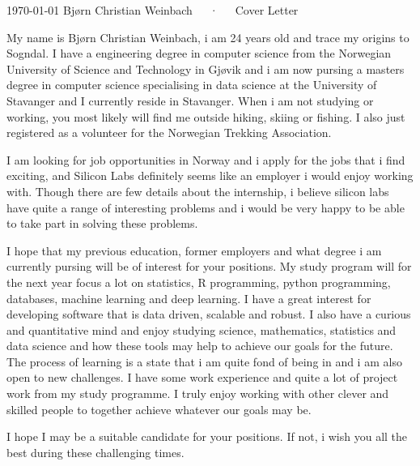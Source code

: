 \documentclass[11pt, a4paper]{awesome-cv}
\begin{document}
\makecvheader[R]

\makecvfooter
  {\today}
  {Bjørn Christian Weinbach~~~·~~~Cover Letter}
  {}

\makelettertitle

\begin{cvletter}

My name is Bjørn Christian Weinbach, i am 24 years old and trace my origins to Sogndal. I have a engineering degree in computer science from the Norwegian University of Science and Technology in Gjøvik and i am now pursing a masters degree in computer science specialising in data science at the University of Stavanger and I currently reside in Stavanger. When i am not studying or working, you most likely will find me outside hiking, skiing or fishing. I also just registered as a volunteer for the Norwegian Trekking Association.

I am looking for job opportunities in Norway and i apply for the jobs that i find exciting, and Silicon Labs definitely seems like an employer i would enjoy working with. Though there are few details about the internship, i believe silicon labs have quite a range of interesting problems and i would be very happy to be able to take part in solving these problems.

I hope that my previous education, former employers and what degree i am currently pursing will be of interest for your positions. My study program will for the next year focus a lot on statistics, R programming, python programming, databases, machine learning and deep learning. I have a great interest for developing software that is data driven,  scalable and robust. I also have a curious and quantitative mind and enjoy studying science, mathematics, statistics and data science and how these tools may help to achieve our goals for the future. The process of learning is a state that i am quite fond of being in and i am also open to new challenges. I have some work experience and quite a lot of project work from my study programme. I truly enjoy working with other clever and skilled people to together achieve whatever our goals may be. 

I hope I may be a suitable candidate for your positions. If not, i wish you all the best during these challenging times.

\end{cvletter}


\makeletterclosing
\end{document}

